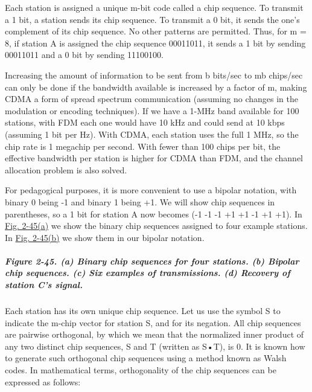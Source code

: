 Each station is assigned a unique {m}-bit code called a {chip sequence}.
To transmit a 1 bit, a station sends its chip sequence. To transmit a 0
bit, it sends the one's complement of its chip sequence. No other
patterns are permitted. Thus, for {m} = 8, if station {A} is assigned
the chip sequence 00011011, it sends a 1 bit by sending 00011011 and a 0
bit by sending 11100100.

Increasing the amount of information to be sent from {b} bits/sec to
{mb} chips/sec can only be done if the bandwidth available is increased
by a factor of {m}, making CDMA a form of spread spectrum communication
(assuming no changes in the modulation or encoding techniques). If we
have a 1-MHz band available for 100 stations, with FDM each one would
have 10 kHz and could send at 10 kbps (assuming 1 bit per Hz). With
CDMA, each station uses the full 1 MHz, so the chip rate is 1 megachip
per second. With fewer than 100 chips per bit, the effective bandwidth
per station is higher for CDMA than FDM, and the channel allocation
problem is also solved.

For pedagogical purposes, it is more convenient to use a bipolar
notation, with binary 0 being -1 and binary 1 being +1. We will show
chip sequences in parentheses, so a 1 bit for station {A} now becomes
(-1 -1 -1 +1 +1 -1 +1 +1). In
\protect\hyperlink{0130661023_ch02lev1sec6.htmlux5cux23ch02fig45}{Fig.
2-45(a)} we show the binary chip sequences assigned to four example
stations. In
\protect\hyperlink{0130661023_ch02lev1sec6.htmlux5cux23ch02fig45}{Fig.
2-45(b)} we show them in our bipolar notation.

\subparagraph[Figure 2-45. (a) Binary chip sequences for four stations.
(b) Bipolar chip sequences. (c) Six examples of transmissions. (d)
Recovery of station C's
signal.]{\texorpdfstring{\protect\hypertarget{0130661023_ch02lev1sec6.htmlux5cux23ch02fig45}{}{}Figure
2-45. (a) Binary chip sequences for four stations. (b) Bipolar chip
sequences. (c) Six examples of transmissions. (d) Recovery of station
C's
signal.}{Figure 2-45. (a) Binary chip sequences for four stations. (b) Bipolar chip sequences. (c) Six examples of transmissions. (d) Recovery of station C's signal.}}


Each station has its own unique chip sequence. Let us use the symbol {S}
to indicate the {m}-chip vector for station {S}, and
 for its negation. All chip sequences are
pairwise {orthogonal}, by which we mean that the normalized inner
product of any two distinct chip sequences, {S} and {T} (written as
{S}•{T}), is 0. It is known how to generate such orthogonal chip
sequences using a method known as {Walsh codes}. In mathematical terms,
orthogonality of the chip sequences can be expressed as follows:

